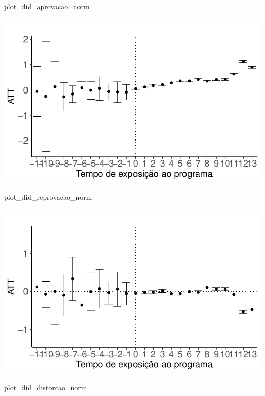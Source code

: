 \documentclass[
  letterpaper,
  DIV=11,
  numbers=noendperiod]{scrartcl}
\newenvironment{Shaded}{\begin{snugshade}}{\end{snugshade}}
\newcommand{\NormalTok}[1]{\textcolor[rgb]{0.00,0.23,0.31}{#1}}
\begin{document}
\begin{Shaded}
\begin{Highlighting}[]
\NormalTok{plot\_did\_aprovacao\_norm}
\end{Highlighting}
\end{Shaded}

\includegraphics{script_files/figure-latex/unnamed-chunk-24-1.pdf}

\begin{Shaded}
\begin{Highlighting}[]
\NormalTok{plot\_did\_reprovacao\_norm}
\end{Highlighting}
\end{Shaded}

\includegraphics{script_files/figure-latex/unnamed-chunk-24-2.pdf}

\begin{Shaded}
\begin{Highlighting}[]
\NormalTok{plot\_did\_distorcao\_norm}
\end{Highlighting}
\end{Shaded}
\end{document}
